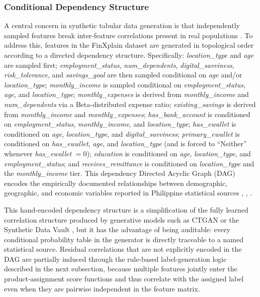 \documentclass{icsthesis}
\begin{document}
\begin{mainmatter}
				\subsubsection{Conditional Dependency Structure}
					A central concern in synthetic tabular data generation is that independently sampled features break inter-feature correlations present in real populations \cite{ref29}. To address this, features in the FinXplain dataset are generated in topological order according to a directed dependency structure. Specifically: \emph{location\_type} and \emph{age} are sampled first; \emph{employment\_status}, \emph{num\_dependents}, \emph{digital\_savviness}, \emph{risk\_tolerance}, and \emph{savings\_goal} are then sampled conditional on \emph{age} and/or \emph{location\_type}; \emph{monthly\_income} is sampled conditional on \emph{employment\_status}, \emph{age}, and \emph{location\_type}; \emph{monthly\_expenses} is derived from \emph{monthly\_income} and \emph{num\_dependents} via a Beta-distributed expense ratio; \emph{existing\_savings} is derived from \emph{monthly\_income} and \emph{monthly\_expenses}; \emph{has\_bank\_account} is conditioned on \emph{employment\_status}, \emph{monthly\_income}, and \emph{location\_type}; \emph{has\_ewallet} is conditioned on \emph{age}, \emph{location\_type}, and \emph{digital\_savviness}; \emph{primary\_ewallet} is conditioned on \emph{has\_ewallet}, \emph{age}, and \emph{location\_type} (and is forced to ``Neither'' whenever \emph{has\_ewallet} $=0$); \emph{education} is conditioned on \emph{age}, \emph{location\_type}, and \emph{employment\_status}; and \emph{receives\_remittance} is conditioned on \emph{location\_type} and the \emph{monthly\_income} tier. This dependency Directed Acyclic Graph (DAG) encodes the empirically documented relationships between demographic, geographic, and economic variables reported in Philippine statistical sources \cite{ref35}, \cite{ref40}, \cite{ref66}.

					This hand-encoded dependency structure is a simplification of the fully learned correlation structure produced by generative models such as CTGAN \cite{ref34} or the Synthetic Data Vault \cite{ref29}, but it has the advantage of being auditable: every conditional probability table in the generator is directly traceable to a named statistical source. Residual correlations that are not explicitly encoded in the DAG are partially induced through the rule-based label-generation logic described in the next subsection, because multiple features jointly enter the product-assignment score functions and thus correlate with the assigned label even when they are pairwise independent in the feature matrix.


\end{mainmatter}
\end{document}
